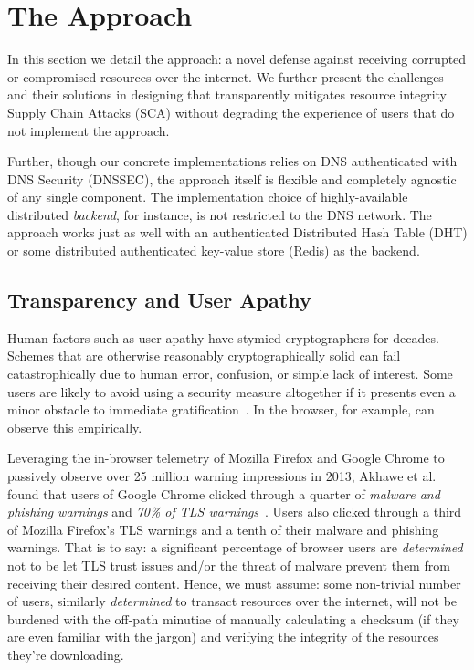 \section{The \SYSTEM{} Approach} \label{sec:approach}

In this section we detail the \SYSTEM{} approach: a novel defense against
receiving corrupted or compromised resources over the internet. We further
present the challenges and their solutions in designing \SYSTEM{} that
transparently mitigates resource integrity Supply Chain Attacks (SCA) without
degrading the experience of users that do not implement the \SYSTEM{} approach.

Further, though our concrete implementations relies on DNS authenticated with
DNS Security (DNSSEC), the approach itself is flexible and completely agnostic
of any single component. The implementation choice of highly-available
distributed \emph{backend}, for instance, is not restricted to the DNS network.
The approach works just as well with an authenticated Distributed Hash Table
(DHT) or some distributed authenticated key-value store (\eg Redis) as the
backend.


\subsection{Transparency and User Apathy}

Human factors such as user apathy have stymied cryptographers for decades.
Schemes that are otherwise reasonably cryptographically solid can fail
catastrophically due to human error, confusion, or simple lack of interest. Some
users are likely to avoid using a security measure altogether if it presents
even a minor obstacle to immediate gratification~\cite{Clickthrough, PGPBad}. In
the browser, for example, can observe this empirically.

Leveraging the in-browser telemetry of Mozilla Firefox and Google Chrome to
passively observe over 25 million warning impressions in 2013, Akhawe et al.
found that users of Google Chrome clicked through a quarter of \emph{malware and
phishing warnings} and \emph{70\% of TLS warnings}~\cite{Clickthrough}. Users
also clicked through a third of Mozilla Firefox's TLS warnings and a tenth of
their malware and phishing warnings. That is to say: a significant percentage of
browser users are \emph{determined} not to be let TLS trust issues and/or the
threat of malware prevent them from receiving their desired content. Hence, we
must assume: some non-trivial number of users, similarly \emph{determined} to
transact resources over the internet, will not be burdened with the off-path
minutiae of manually calculating a checksum (if they are even familiar with the
jargon) and verifying the integrity of the resources they're downloading.

